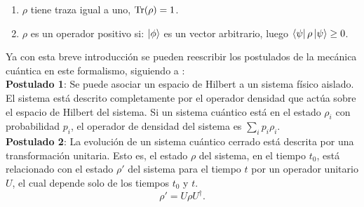 \begin{enumerate}
\item $\rho$ tiene traza igual a uno, $\Tr(\rho)=1$.

\item $\rho$ es un operador positivo si: $\ket{\phi}$ es un vector arbitrario, luego $\bra{\psi}\rho\ket{\psi} \geq 0$.
\end{enumerate}
Ya con esta breve introducción se pueden reescribir los postulados de la mecánica cuántica en este formalismo, siguiendo a \cite{NielsenInformation}:
\\
\textbf{Postulado 1}: Se puede asociar un espacio de Hilbert a un sistema físico aislado. El sistema está descrito completamente por el operador densidad que actúa sobre el espacio de Hilbert del sistema. Si un sistema cuántico está en el estado $\rho_{i}$ con probabilidad $p_{i}$, el operador de densidad del sistema es $\sum_{i} p_{i} \rho_{i}$.
\\

\textbf{Postulado 2}: La evolución de un sistema cuántico cerrado está descrita por una transformación unitaria. Esto es, el estado $\rho$ del sistema, en el tiempo $t_{0}$, está relacionado con el estado $\rho'$ del sistema para el tiempo $t$ por un operador unitario $U$, el cual depende solo de los tiempos $t_{0}$ y $t$. 
\begin{equation}
\rho' = U \rho U^{\dagger}.
\end{equation}
\\

